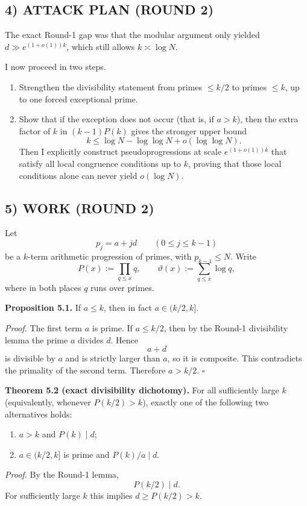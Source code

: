 \subsection*{4) ATTACK PLAN (ROUND 2)}
The exact Round-1 gap was that the modular argument only yielded $d\gg e^{(1+o(1))k}$, which still allows $k\asymp \log N$.

I now proceed in two steps.
\begin{enumerate}
\item Strengthen the divisibility statement from primes $\le k/2$ to primes $\le k$, up to one forced exceptional prime.
\item Show that if the exception does not occur (that is, if $a>k$), then the extra factor of $k$ in $(k-1)P(k)$ gives the stronger upper bound
\[
k\le \log N-\log\log N+o(\log\log N).
\]
Then I explicitly construct pseudoprogressions at scale $e^{(1+o(1))k}$ that satisfy all local congruence conditions up to $k$, proving that those local conditions alone can never yield $o(\log N)$.
\end{enumerate}

\subsection*{5) WORK (ROUND 2)}
Let
\[
p_j=a+jd\qquad (0\le j\le k-1)
\]
be a $k$-term arithmetic progression of primes, with $p_{k-1}\le N$.
Write
\[
P(x):=\prod_{q\le x} q,
\qquad
\vartheta(x):=\sum_{q\le x}\log q,
\]
where in both places $q$ runs over primes.

\medskip
\noindent\textbf{Proposition 5.1.}
If $a\le k$, then in fact $a\in (k/2,k]$.

\smallskip
\noindent\emph{Proof.}
The first term $a$ is prime.  If $a\le k/2$, then by the Round-1 divisibility lemma the prime $a$ divides $d$.  Hence
\[
a+d
\]
is divisible by $a$ and is strictly larger than $a$, so it is composite.  This contradicts the primality of the second term.  Therefore $a>k/2$. \hfill$\square$

\medskip
\noindent\textbf{Theorem 5.2 (exact divisibility dichotomy).}
For all sufficiently large $k$ (equivalently, whenever $P(k/2)>k$), exactly one of the following two alternatives holds:
\begin{enumerate}
\item $a>k$ and $P(k)\mid d$;
\item $a\in (k/2,k]$ is prime and $P(k)/a\mid d$.
\end{enumerate}

\smallskip
\noindent\emph{Proof.}
By the Round-1 lemma,
\[
P(k/2)\mid d.
\]
For sufficiently large $k$ this implies $d\ge P(k/2)>k$.

